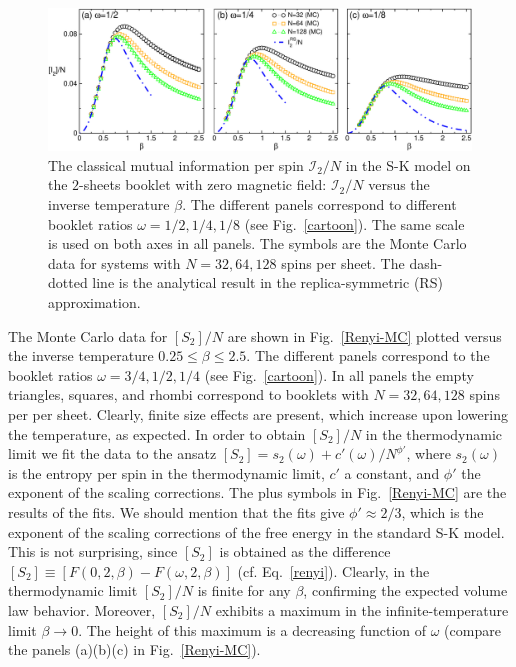 \documentclass[twocolumn,superscriptaddress,prb,10pt]{revtex4-1}
\begin{document}
\begin{figure}[t]
\includegraphics*[width=0.93\linewidth]{./draft_figs/I2_MC_v1}
\caption{The classical mutual information per spin ${\mathcal I}_2/N$ 
 in the S-K model on the $2$-sheets booklet with zero magnetic field: 
 ${\mathcal I}_2/N$ versus the inverse temperature $\beta$. The 
 different panels correspond to different booklet ratios $\omega=1/2,1/4,1/8$ 
 (see Fig.~\ref{cartoon}). The same scale is used on both axes in all 
 panels. The symbols are the Monte Carlo data 
 for systems with $N=32,64,128$ spins per sheet. The dash-dotted line is 
 the analytical result in the replica-symmetric (RS) approximation.  
}
\label{I2-MC}
\end{figure}

The Monte Carlo data for $[S_2]/N$  are shown in Fig.~\ref{Renyi-MC} plotted versus the 
inverse temperature $0.25\le\beta\le 2.5$. The different panels correspond to the  
booklet ratios $\omega=3/4,1/2,1/4$ (see Fig.~\ref{cartoon}). In all panels the empty 
triangles, squares, and rhombi correspond to booklets with $N=32,64,128$ spins per per sheet. 
Clearly, finite size effects are present, which increase upon lowering 
the temperature, as expected. In order to obtain $[S_2]/N$ in the thermodynamic limit 
we fit the data to the ansatz $[S_2]=s_2(\omega)+c'(\omega)/N^{\phi'}$, where 
$s_2(\omega)$ is the entropy per spin in the thermodynamic limit, $c'$ a constant, and 
$\phi'$ the exponent of the scaling corrections. The plus symbols in Fig.~\ref{Renyi-MC} 
are the results of the fits. We should mention that the fits give $\phi'\approx 2/3$, 
which is the exponent of the scaling corrections of the free energy in the standard 
S-K model. This is not surprising, since $[S_2]$ is obtained as the difference 
$[S_2]\equiv [F(0,2,\beta)-F(\omega,2,\beta)]$ (cf. Eq.~\eqref{renyi}). 
Clearly, in the thermodynamic limit $[S_2]/N$ is finite for any $\beta$, 
confirming the expected volume law behavior. Moreover, $[S_2]/N$ 
exhibits a maximum in the infinite-temperature limit $\beta\to0$. The height of this 
maximum  is a decreasing function of $\omega$ (compare the panels (a)(b)(c) in 
Fig.~\ref{Renyi-MC}). 
\end{document}
